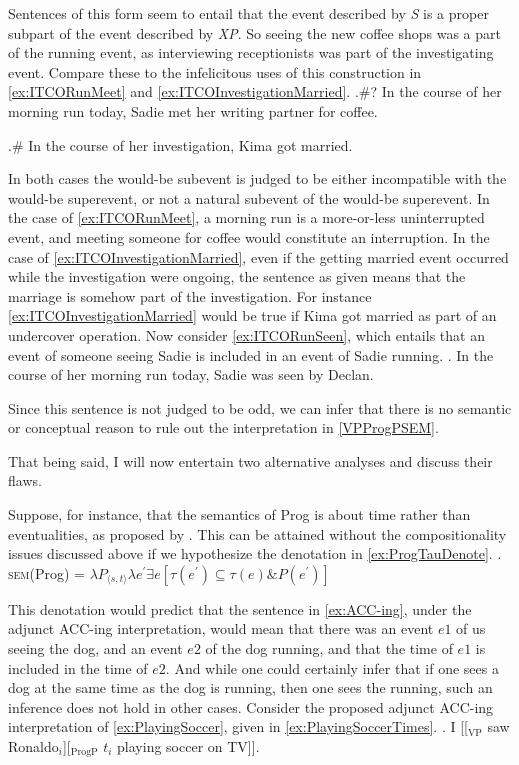 \documentclass[MilwayThesis]{subfiles}
\begin{document}
Sentences of this form seem to entail that the event described by \textit{S} is a proper subpart of the event described by \textit{XP}.
So seeing the new coffee shops was a part of the running event, as interviewing receptionists was part of the investigating event.
Compare these to the infelicitous uses of this construction in \cref{ex:ITCORunMeet} and \cref{ex:ITCOInvestigationMarried}.
\ex.\#? In the course of her morning run today, Sadie met her writing partner for coffee.\label{ex:ITCORunMeet}

\ex.\# In the course of her investigation, Kima got married.\label{ex:ITCOInvestigationMarried}

In both cases the would-be subevent is judged to be either incompatible with the would-be superevent, or not a natural subevent of the would-be superevent.
In the case of \cref{ex:ITCORunMeet}, a morning run is a more-or-less uninterrupted event, and meeting someone for coffee would constitute an interruption.
In the case of \cref{ex:ITCOInvestigationMarried}, even if the getting married event occurred while the investigation were ongoing, the sentence as given means that the marriage is somehow part of the investigation.
For instance \cref{ex:ITCOInvestigationMarried} would be true if Kima got married as part of an undercover operation.
Now consider \cref{ex:ITCORunSeen}, which entails that an event of someone seeing Sadie is included in an event of Sadie running.
\ex.\label{ex:ITCORunSeen} In the course of her morning run today, Sadie was seen by Declan.

Since this sentence is not judged to be odd, we can infer that there is no semantic or conceptual reason to rule out the interpretation in \cref{VPProgPSEM}.

That being said, I will now entertain two alternative analyses and discuss their flaws.

Suppose, for instance, that the semantics of Prog is about time rather than eventualities, as proposed by \textcite{klein1994time}.
This can be attained without the compositionality issues discussed above if we hypothesize the denotation in \cref{ex:ProgTauDenote}.
\ex.\label{ex:ProgTauDenote} \textsc{sem}(Prog) = $\lambda P_{\langle s,t\rangle} \lambda e^{\prime} \exists e [\tau(e^{\prime}) \subseteq \tau(e) \& P(e^{\prime})]$

This denotation would predict that the sentence in \cref{ex:ACC-ing}, under the adjunct ACC-ing interpretation, would mean that there was an event $e1$ of us seeing the dog, and an event $e2$ of the dog running, and that the time of $e1$ is included in the time of $e2$.
And while one could certainly infer that if one sees a dog at the same time as the dog is running, then one sees the running, such an inference does not hold in other cases.
Consider the proposed adjunct ACC-ing interpretation of \cref{ex:PlayingSoccer}, given in \cref{ex:PlayingSoccerTimes}.
\ex.\label{ex:PlayingSoccer} I [[$_{\text{VP}}$ saw Ronaldo$_{i}$][$_{\text{ProgP}}$ $t_{i}$ playing soccer on TV]].
\end{document}
